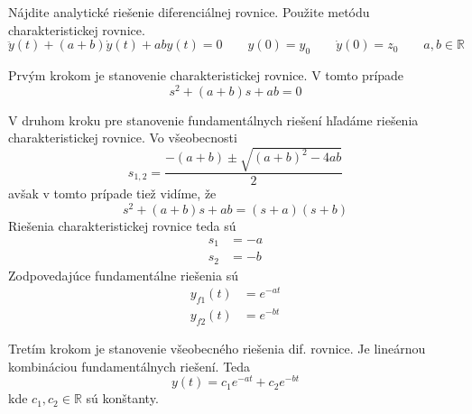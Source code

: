 \documentclass[a4paper, 10pt, ]{article}
\begin{document}
Nájdite analytické riešenie diferenciálnej rovnice. Použite metódu charakteristickej rovnice.
\begin{equation*} 
    \ddot y(t) + (a+b) \dot y(t) + a b y(t) = 0  \qquad y(0) = y_0 \qquad \dot y(0) = z_0 \qquad a,b \in \mathbb{R}
\end{equation*}

Prvým krokom je stanovenie charakteristickej rovnice. V tomto prípade
\begin{equation}
    s^2 + (a+b) s + a b = 0 
\end{equation}

V druhom kroku pre stanovenie fundamentálnych riešení hľadáme riešenia charakteristickej rovnice. Vo všeobecnosti
\begin{equation}
    s_{1,2} = \frac{-(a + b) \pm \sqrt{(a + b)^2 - 4  ab}}{2}
\end{equation}
avšak v tomto prípade tiež vidíme, že
\begin{equation}
    s^2 + (a+b) s + a b = (s + a)(s + b)
\end{equation}
Riešenia charakteristickej rovnice teda sú
\begin{subequations}
    \begin{align}
        s_1 &= -a \\
        s_2 &= -b
    \end{align}
\end{subequations}
Zodpovedajúce fundamentálne riešenia sú
\begin{subequations}
    \begin{align}
        y_{f1}(t) &= e^{-at} \\
        y_{f2}(t) &= e^{-bt}
    \end{align}
\end{subequations}

Tretím krokom je stanovenie všeobecného riešenia dif. rovnice. Je lineárnou kombináciou fundamentálnych riešení. Teda
\begin{equation}
    y(t) = c_1 e^{-at} + c_2 e^{-bt}
\end{equation}
kde $c_1, c_2 \in \mathbb{R}$ sú konštanty.
\end{document}
